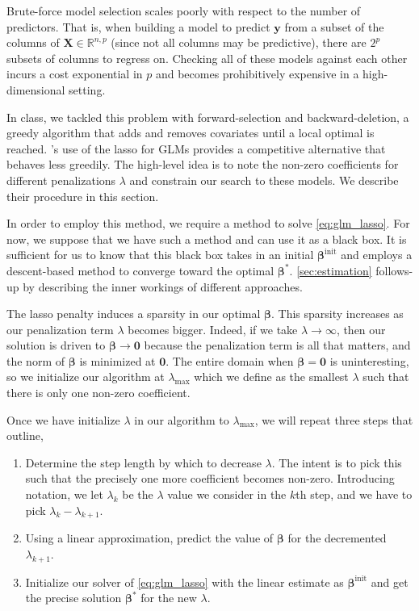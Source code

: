 \documentclass[letterpaper, 12pt]{article}
\newcommand{\bX}{\bm X}
\newcommand{\bbeta}{\bm \beta}
\begin{document}
Brute-force model selection scales poorly with respect to the number of
predictors. That is, when building a model to predict $\bm{y}$ from a subset of
the columns of $\bX \in \mathbb{R}^{n,p}$ (since not all columns may be
predictive), there are $2^p$ subsets of columns to regress on. Checking all of
these models against each other incurs a cost exponential in $p$ and becomes
prohibitively expensive in a high-dimensional setting.

In class, we tackled this problem with forward-selection and backward-deletion,
a greedy algorithm that adds and removes covariates until a local optimal is
reached. \cite{park2007l1}'s use of the lasso for GLMs provides a competitive
alternative that behaves less greedily. The high-level idea is to note the
non-zero coefficients for different penalizations $\lambda$ and constrain our
search to these models. We describe their procedure in this section.

In order to employ this method, we require a method to solve
\eqref{eq:glm_lasso}. For now, we suppose that we have such a method and can use
it as a black box. It is sufficient for us to know that this black box takes in
an initial $\bbeta^\text{init}$ and employs a descent-based method to converge
toward the optimal $\bbeta^*$. \cref{sec:estimation} follows-up by describing
the inner workings of different approaches.

The lasso penalty induces a sparsity in our optimal $\bbeta$. This sparsity
increases as our penalization term $\lambda$ becomes bigger. Indeed, if we take
$\lambda \to \infty$, then our solution is driven to $\bbeta \to \bm{0}$ because
the penalization term is all that matters, and the norm of $\bbeta$ is minimized
at $\bm{0}$. The entire domain when $\bbeta = \bm{0}$ is uninteresting, so we
initialize our algorithm at $\lambda_\text{max}$ which we define as the smallest
$\lambda$ such that there is only one non-zero coefficient.

Once we have initialize $\lambda$ in our algorithm to $\lambda_\text{max}$, we
will repeat three steps that \cite{park2007l1} outline,

\begin{enumerate}

\item Determine the step length by which to decrease $\lambda$. The intent is to
pick this such that the precisely one more coefficient becomes non-zero.
Introducing notation, we let $\lambda_k$ be the $\lambda$ value we consider in
the $k$th step, and we have to pick $\lambda_k - \lambda_{k+1}$.

\item Using a linear approximation, predict the value of $\bbeta$ for the
decremented $\lambda_{k+1}$.

\item Initialize our solver of \eqref{eq:glm_lasso} with the linear estimate as
$\bbeta^\text{init}$ and get the precise solution $\bbeta^*$ for the new
$\lambda$.

\end{enumerate}
\end{document}
